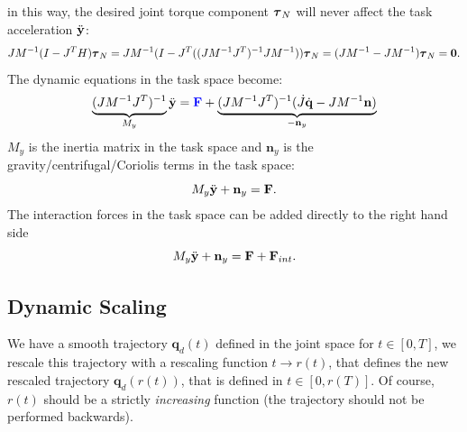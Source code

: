 \documentclass[10pt, a4paper]{report}
\newcommand{\q}{{\mathbf q}}
\begin{document}
in this way, the desired joint torque component ${\boldsymbol{\tau}}_N$ will never affect the task acceleration ${\ddot{\mathbf y}}$:
\begin{equation}
    JM^{-1}(I-J^TH){\boldsymbol{\tau}}_N = JM^{-1}(I-J^T((JM^{-1}J^T)^{-1}JM^{-1})){\boldsymbol{\tau}}_N=(JM^{-1}-JM^{-1}){\boldsymbol{\tau}}_N=\mathbf{0}.
\end{equation}
The dynamic equations in the task space become:\begin{equation}
    \underbrace{(JM^{-1}J^T)^{-1}}_{M_y}{\ddot{\mathbf y}} = \color{blue}\mathbf F\color{black}+
    \underbrace{(JM^{-1}J^T)^{-1}(\dot J{\dot{\mathbf q}}-JM^{-1}\mathbf n)}_{-\mathbf n_y}
\end{equation}
$M_y$ is the inertia matrix in the task space and $\mathbf n_y$ is the gravity/centrifugal/Coriolis terms in the task space:\begin{equation}
    M_y{\ddot{\mathbf y}}+\mathbf n_y=\mathbf F.
\end{equation}
The interaction forces in the task space can be added directly to the right hand side\begin{equation}
    M_y{\ddot{\mathbf y}}+\mathbf n_y=\mathbf F+\mathbf F_{int}.
\end{equation}
\subsection{Dynamic Scaling}
We have a smooth trajectory $\q_d(t)$ defined in the joint space for $t\in [0,T]$, we rescale this trajectory with a rescaling function $t\rightarrow r(t)$, that defines the new rescaled trajectory $\q_d(r(t))$, that is defined in $t\in [0,r(T)]$. Of course, $r(t)$ should be a strictly \textit{increasing} function (the trajectory should not be performed backwards).
\bigskip
\end{document}
